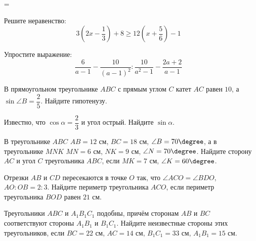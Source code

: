 =%
\begin{exam}
	\begin{listofex}
		\item Решите неравенство:
		\[3\left( 2x-\dfrac{1}{3} \right)+8\ge12\left( x+\dfrac{5}{6} \right)-1\]
		\item Упростите выражение:
		\[\dfrac{6}{a-1}-\dfrac{10}{(a-1)^2}:\dfrac{10}{a^2-1}-\dfrac{2a+2}{a-1}\]
		\item В прямоугольном треугольнике \( ABC \) с прямым углом \( C \) катет \( AC \) равен \( 10 \), а \( \sin\angle B=\dfrac{2}{5} \). Найдите гипотенузу.
		\item Известно, что \( \cos\alpha=\dfrac{2}{3} \) и угол острый. Найдите \( \sin\alpha \).
		\item В треугольнике \( ABC \) \( AB=12 \) см, \( BC=18 \) см, \( \angle B=70\degree \), а в треугольнике \( MNK \) \( MN=6 \) см, \( NK=9 \) см, \( \angle N=70\degree \). Найдите сторону \( AC \) и угол \( C \) треугольника \( ABC \), если \( MK=7 \) см, \( \angle K=60\degree \).
		\item Отрезки \( AB \) и \( CD \) пересекаются в точке \( O \) так, что \( \angle ACO=\angle BDO \), \( AO:OB=2:3 \). Найдите периметр треугольника \( ACO \), если периметр треугольника \( BOD \) равен \( 21 \) см.
		\item Треугольники \( ABC \) и \( A_1B_1C_1 \) подобны, причём сторонам \( AB \) и \( BC \) соответствуют стороны \( A_1B_1 \) и \( B_1C_1 \). Найдите неизвестные стороны этих треугольников, если \( BC=22 \) см, \( AC=14 \) см, \( B_1C_1=33 \) см, \( A_1B_1=15 \) см.
	\end{listofex}
\end{exam}
